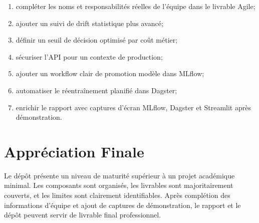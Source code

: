 \begin{enumerate}
    \item compléter les noms et responsabilités réelles de l'équipe dans le livrable Agile;
    \item ajouter un suivi de drift statistique plus avancé;
    \item définir un seuil de décision optimisé par coût métier;
    \item sécuriser l'API pour un contexte de production;
    \item ajouter un workflow clair de promotion modèle dans MLflow;
    \item automatiser le réentraînement planifié dans Dagster;
    \item enrichir le rapport avec captures d'écran MLflow, Dagster et Streamlit après démonstration.
\end{enumerate}

\section{Appréciation Finale}

Le dépôt présente un niveau de maturité supérieur à un projet académique minimal. Les composants sont organisés, les livrables sont majoritairement couverts, et les limites sont clairement identifiables. Après complétion des informations d'équipe et ajout de captures de démonstration, le rapport et le dépôt peuvent servir de livrable final professionnel.
